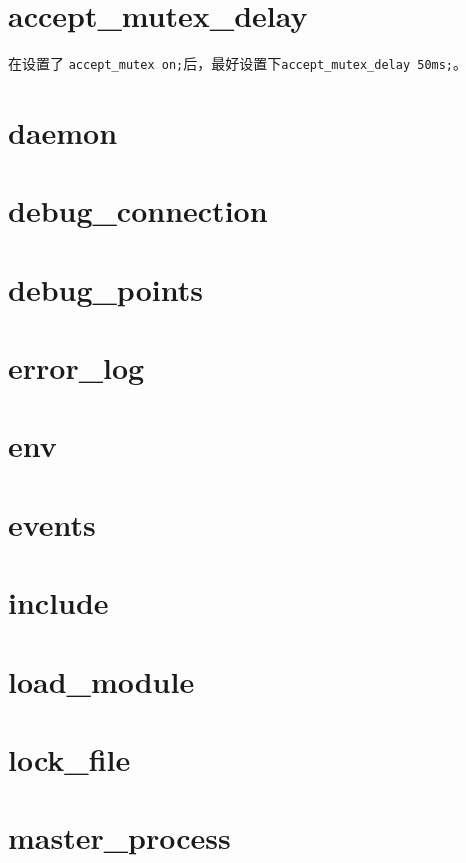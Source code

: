 \chapter{accept\_mutex\_delay}

在设置了 \texttt{accept\_mutex on;}后，最好设置下\texttt{accept\_mutex\_delay 50ms;}。



\chapter{daemon}


\chapter{debug\_connection}



\chapter{debug\_points}


\chapter{error\_log}


\chapter{env}


\chapter{events}


\chapter{include}



\chapter{load\_module}


\chapter{lock\_file}



\chapter{master\_process}


